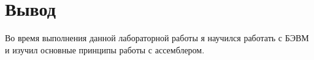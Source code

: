 \section{Вывод}
Во время выполнения данной лабораторной работы я научился работать с БЭВМ и 
изучил основные принципы работы с ассемблером.